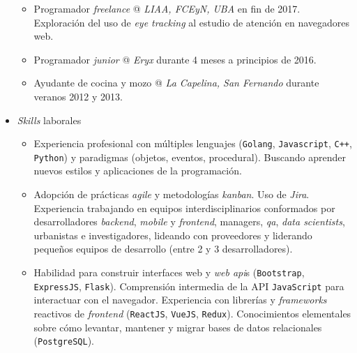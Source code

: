 \documentclass[a4paper]{article}
\begin{document}
\begin{itemize}
\begin{itemize}
    \item
      Programador \textit{freelance} @ \textit{LIAA, FCEyN, UBA} en fin de 2017.
      \newline
      Exploración del uso de \textit{eye tracking} al estudio de atención en
      navegadores web.

    \item
      Programador \textit{junior} @ \textit{Eryx} durante 4 meses a principios
      de 2016.

    \item
      Ayudante de cocina y mozo @ \textit{La Capelina, San Fernando} durante
      veranos 2012 y 2013.

  \end{itemize}

  \item \textit{Skills} laborales
  \begin{itemize}

    \item
      Experiencia profesional con múltiples lenguajes (\texttt{Golang},
      \texttt{Javascript}, \texttt{C}\verb|++|, \texttt{Python}) y paradigmas
      (objetos, eventos, procedural). \newline
      Buscando aprender nuevos estilos y aplicaciones de la programación.

    \item
      Adopción de prácticas \textit{agile} y metodologías \textit{kanban}.
      Uso de \textit{Jira}. \newline
      Experiencia trabajando en equipos interdisciplinarios conformados por
      desarrolladores \textit{backend}, \textit{mobile} y \textit{frontend},
      managers, \textit{qa}, \textit{data scientists}, urbanistas e
      investigadores, lideando con proveedores y liderando pequeños equipos de
      desarrollo (entre 2 y 3 desarrolladores).

    \item
      Habilidad para construir interfaces web y \textit{web api}s
      (\texttt{Bootstrap}, \newline \texttt{ExpressJS}, \texttt{Flask}).
      \newline
      Comprensión intermedia de la API \texttt{JavaScript} para interactuar con
      el navegador. \newline
      Experiencia con librerías y \textit{frameworks} reactivos de
      \textit{frontend} (\texttt{ReactJS}, \texttt{VueJS},
      \texttt{Redux}).\newline
      Conocimientos elementales sobre cómo levantar, mantener y migrar bases de
      datos relacionales (\texttt{PostgreSQL}).


\end{itemize}
\end{itemize}
\end{document}
